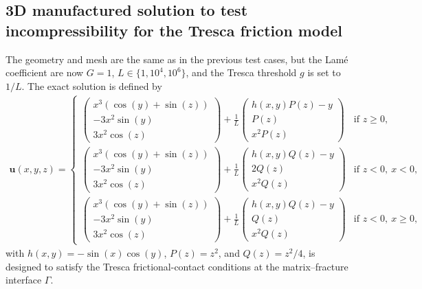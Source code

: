 \documentclass[a4paper,11pt]{article}
\theoremstyle{definition}
\theoremstyle{remark}
\newcommand{\bo}[1]{\mathbf{#1}}
\def\[{\partial}
\begin{document}
\subsection{3D manufactured solution to test incompressibility for the Tresca friction model}\label{subsec.6.3}
The geometry and mesh are the same as in the previous test cases, but the Lamé coefficient are now $G = 1$, $L\in\{1,10^4,10^6\}$, and the Tresca threshold $g$ is set to $1/L$. The exact solution is defined by
\begin{align*}%
\bo{u}(x,y,z) =
\begin{cases}\begin{pmatrix}
x^3(\cos(y)+\sin(z)) \\
-3x^2\sin(y) \\
3x^2\cos(z)
\end{pmatrix}+\frac{1}{L}
\begin{pmatrix}
h(x,y)P(z) - y \\
P(z) \\
x^2 P(z)
\end{pmatrix} & \text{if } z \ge 0, \\[1.2em]
\begin{pmatrix}
x^3(\cos(y)+\sin(z)) \\
-3x^2\sin(y) \\
3x^2\cos(z)
\end{pmatrix}+\frac{1}{L}
\begin{pmatrix}
h(x,y)Q(z) - y \\
2Q(z) \\
x^2 Q(z)
\end{pmatrix} & \text{if } z < 0,~ x < 0, \\[1.2em]
\begin{pmatrix}
x^3(\cos(y)+\sin(z)) \\
-3x^2\sin(y) \\
3x^2\cos(z)
\end{pmatrix}+\frac{1}{L}
\begin{pmatrix}
h(x,y)Q(z) - y \\
Q(z) \\
x^2 Q(z)
\end{pmatrix} & \text{if } z < 0,~ x \ge 0,
\end{cases}
\end{align*}
with $h(x,y) = -\sin(x)\cos(y)$, $P(z) = z^2$, and $Q(z) = z^2/4$, 
is designed to satisfy the Tresca frictional-contact conditions at the matrix–fracture interface $\Gamma$.
\end{document}
